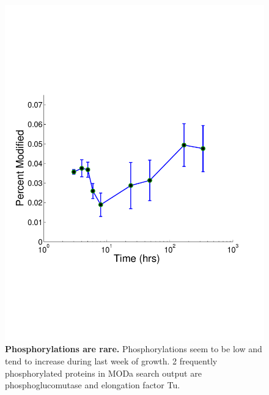 \documentclass[12pt]{article}
\begin{document}
\clearpage
\begin{figure}[p]
\centerline{\includegraphics[width=5in]{Figures/Phosphorylations.pdf}}
\caption{\label{fig:Phos}\textbf{Phosphorylations are rare.} Phosphorylations seem to be low and tend to increase during last week of growth. 2 frequently phosphorylated proteins in MODa search output are phosphoglucomutase and elongation factor Tu.}
\end{figure}
\end{document}
